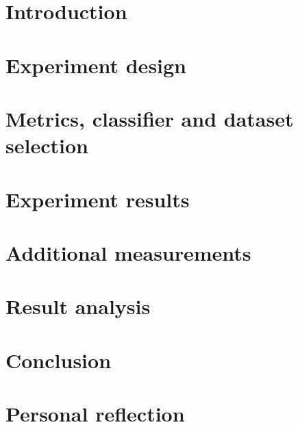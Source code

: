 \documentclass[a4paper,11pt,pdftex,halfparskip,oneside,cleardoubleempty]{scrbook}
\begin{document}

\pagestyle{plain} 



\chapter{Introduction}
\label{sec:introduction}


\chapter{Experiment design}
\label{sec:experiment}


\chapter{Metrics, classifier and dataset selection}
\label{sec:selection}


\chapter{Experiment results}
\label{sec:results}


\chapter{Additional measurements}
\label{sec:additional}


\chapter{Result analysis}
\label{sec:testing}



\chapter{Conclusion}
\label{sec:conclusion}


\chapter{Personal reflection}
\label{sec:reflection}




\end{document}

